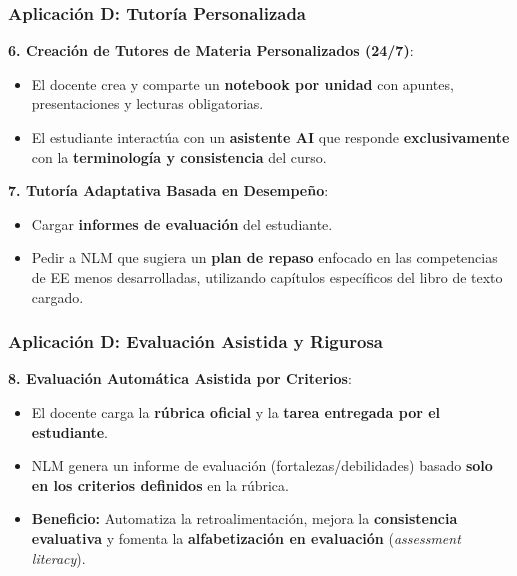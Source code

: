 \documentclass[aspectratio=43]{beamer}
\begin{document}
\begin{frame}
\frametitle{ Aplicación D: Tutoría Personalizada}

\textbf{6. Creación de Tutores de Materia Personalizados (24/7)}:
\begin{itemize}
    \item El docente crea y comparte un \textbf{notebook por unidad} con apuntes, presentaciones y lecturas obligatorias.
    \item El estudiante interactúa con un \textbf{asistente AI} que responde \textbf{exclusivamente} con la \textbf{terminología y consistencia} del curso.
\end{itemize}

\textbf{7. Tutoría Adaptativa Basada en Desempeño}:
\begin{itemize}
    \item Cargar \textbf{informes de evaluación} del estudiante.
    \item Pedir a NLM que sugiera un \textbf{plan de repaso} enfocado en las competencias de EE menos desarrolladas, utilizando capítulos específicos del libro de texto cargado.
\end{itemize}
\end{frame}

\begin{frame}
\frametitle{ Aplicación D: Evaluación Asistida y Rigurosa}

\textbf{8. Evaluación Automática Asistida por Criterios}:
\begin{itemize}
    \item El docente carga la \textbf{rúbrica oficial} y la \textbf{tarea entregada por el estudiante}.
    \item NLM genera un informe de evaluación (fortalezas/debilidades) basado \textbf{solo en los criterios definidos} en la rúbrica.
    \item \textbf{Beneficio:} Automatiza la retroalimentación, mejora la \textbf{consistencia evaluativa} y fomenta la \textbf{alfabetización en evaluación} (\textit{assessment literacy}).
\end{itemize}

\end{frame}
\end{document}
